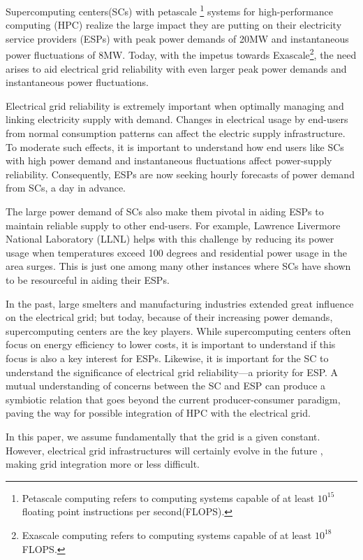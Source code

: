 Supercomputing centers(SCs) with petascale
\footnote{Petascale computing refers to computing systems capable of at
least \(10^{15}\) floating point instructions per second(FLOPS).} 
systems for high-performance computing (HPC) realize the large 
impact they are putting on their electricity service providers (ESPs) with peak 
power demands of 20MW and instantaneous power fluctuations of 8MW. 
Today, with the impetus 
towards Exascale\footnote{Exascale computing refers to computing systems capable of at
least \(10^{18}\)FLOPS.}, 
the need arises to
aid electrical grid reliability  with even larger peak power demands and 
instantaneous power fluctuations.

Electrical grid reliability is extremely important when optimally managing and 
linking electricity supply with demand. Changes in electrical usage by end-users from normal 
consumption patterns can affect the electric supply infrastructure. 
To moderate such effects, it is important to understand how end users like SCs with 
high power demand and instantaneous fluctuations
affect power-supply reliability. 
Consequently, ESPs are now seeking hourly forecasts of power demand from SCs, a day in advance.

The large power demand of SCs also make them pivotal in  
aiding ESPs to maintain reliable supply to other end-users. 
For example, Lawrence Livermore National Laboratory (LLNL)
helps with this challenge by reducing its power usage when temperatures exceed 
100 degrees and residential power usage in the area surges.
This is just one among many other instances where SCs have shown to be  
resourceful in aiding their ESPs.

In the past, large smelters and manufacturing industries extended 
great influence on the electrical grid; but today, because of their increasing power demands,
supercomputing centers are the key players.
While supercomputing centers often focus on energy efficiency to lower costs, 
it is important to understand if this focus is also a key interest for ESPs.
Likewise, it is important for the SC to understand the significance of electrical grid 
reliability---a priority for ESP. 
A mutual understanding of concerns between the SC and ESP can 
produce a symbiotic relation that goes beyond the current producer-consumer 
paradigm, paving the way for possible integration of HPC with the electrical grid.

In this paper, we assume fundamentally that the grid is a given constant. However, 
electrical grid infrastructures will certainly evolve in the 
future \cite{he_architecture_2008}, making grid integration more or less difficult.

